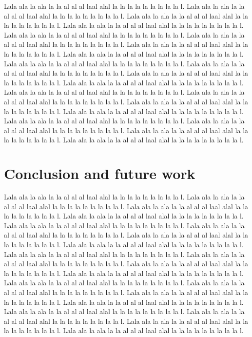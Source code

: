 \documentclass{article}
\begin{document}
Lala ala la ala la la al al al laal alal la la la la la la la la la l. Lala ala la ala la la al al al laal alal la la la la la la la la la l. Lala ala la ala la la al al al laal alal la la la la la la la la la l. Lala ala la ala la la al al al laal alal la la la la la la la la la l. Lala ala la ala la la al al al laal alal la la la la la la la la la l. Lala ala la ala la la al al al laal alal la la la la la la la la la l. Lala ala la ala la la al al al laal alal la la la la la la la la la l. Lala ala la ala la la al al al laal alal la la la la la la la la la l. Lala ala la ala la la al al al laal alal la la la la la la la la la l. Lala ala la ala la la al al al laal alal la la la la la la la la la l. Lala ala la ala la la al al al laal alal la la la la la la la la la l. Lala ala la ala la la al al al laal alal la la la la la la la la la l. Lala ala la ala la la al al al laal alal la la la la la la la la la l. Lala ala la ala la la al al al laal alal la la la la la la la la la l. Lala ala la ala la la al al al laal alal la la la la la la la la la l. Lala ala la ala la la al al al laal alal la la la la la la la la la l. Lala ala la ala la la al al al laal alal la la la la la la la la la l. Lala ala la ala la la al al al laal alal la la la la la la la la la l. Lala ala la ala la la al al al laal alal la la la la la la la la la l. Lala ala la ala la la al al al laal alal la la la la la la la la la l. 


\section{Conclusion and future work}

Lala ala la ala la la al al al laal alal la la la la la la la la la l. Lala ala la ala la la al al al laal alal la la la la la la la la la l. Lala ala la ala la la al al al laal alal la la la la la la la la la l. Lala ala la ala la la al al al laal alal la la la la la la la la la l. Lala ala la ala la la al al al laal alal la la la la la la la la la l. Lala ala la ala la la al al al laal alal la la la la la la la la la l. Lala ala la ala la la al al al laal alal la la la la la la la la la l. Lala ala la ala la la al al al laal alal la la la la la la la la la l. Lala ala la ala la la al al al laal alal la la la la la la la la la l. Lala ala la ala la la al al al laal alal la la la la la la la la la l. Lala ala la ala la la al al al laal alal la la la la la la la la la l. Lala ala la ala la la al al al laal alal la la la la la la la la la l. Lala ala la ala la la al al al laal alal la la la la la la la la la l. Lala ala la ala la la al al al laal alal la la la la la la la la la l. Lala ala la ala la la al al al laal alal la la la la la la la la la l. Lala ala la ala la la al al al laal alal la la la la la la la la la l. Lala ala la ala la la al al al laal alal la la la la la la la la la l. Lala ala la ala la la al al al laal alal la la la la la la la la la l. Lala ala la ala la la al al al laal alal la la la la la la la la la l. Lala ala la ala la la al al al laal alal la la la la la la la la la l. 


\printbibliography
\nocite{*}
\end{document}
